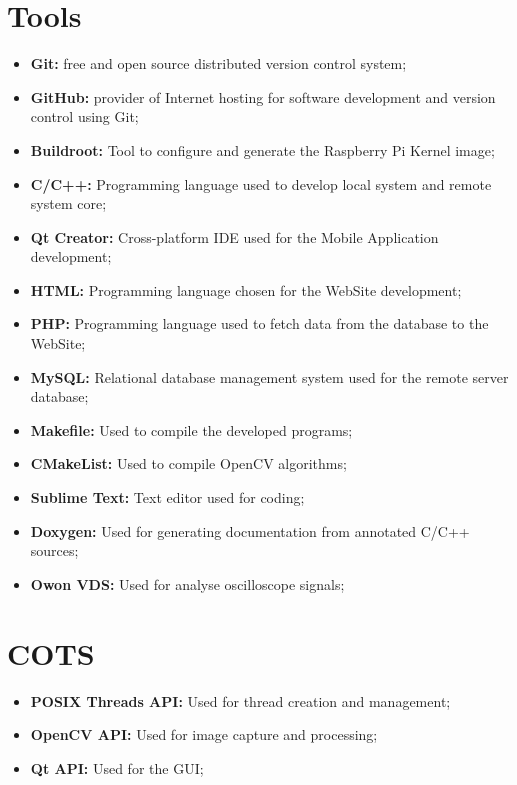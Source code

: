 \clearpage
\section{Tools}

\begin{itemize}
	\item \textbf{Git:} free and open source distributed version control system;
	\item \textbf{GitHub:} provider of Internet hosting for software development and version control using Git;
	\item \textbf{Buildroot:} Tool to configure and generate the Raspberry Pi Kernel image;
	\item \textbf{C/C++:} Programming language used to develop local system and remote system core;
	\item \textbf{Qt Creator:} Cross-platform IDE used for the Mobile Application development;
	\item \textbf{HTML:} Programming language chosen for the WebSite development;
	\item \textbf{PHP:} Programming language used to fetch data from the database to the WebSite;
	\item \textbf{MySQL:} Relational database management system used for the remote server database;
	\item \textbf{Makefile:} Used to compile the developed programs;
	\item \textbf{CMakeList:} Used to compile OpenCV algorithms;
	\item \textbf{Sublime Text:} Text editor used for coding;
	\item \textbf{Doxygen:} Used for generating documentation from annotated C/C++ sources;
	\item \textbf{Owon VDS:} Used for analyse oscilloscope signals;
\end{itemize}

\section{COTS}

\begin{itemize}
	\item \textbf{POSIX Threads API:} Used for thread creation and management;
	\item \textbf{OpenCV API:} Used for image capture and processing;
	\item \textbf{Qt API:} Used for the GUI;
\end{itemize}


